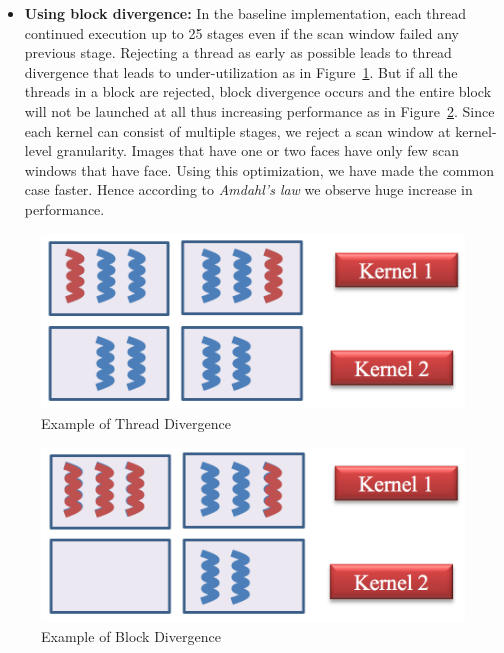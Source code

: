 \begin{itemize}
\vspace{0.1in}
\item \textbf{Using block divergence:}
In the baseline implementation, each thread continued execution up to 25 stages 
even if the scan window failed any previous stage. Rejecting a thread as early as possible leads to thread 
divergence that leads to under-utilization as in Figure~\ref{fig:tdiv}. But if all the threads in a block 
are rejected, block divergence occurs and the entire block will not be launched at all thus increasing 
performance as in Figure~\ref{fig:bdiv}. Since each kernel can consist of multiple stages, we reject a 
scan window at kernel-level granularity. Images that have one or two faces have only few scan windows that 
have face. Using this optimization, we have made the common case faster. Hence according to 
\emph{Amdahl’s law} we observe huge increase in performance. 

\end{itemize}
\begin{figure}[h]
  \centering 
  \includegraphics[width=\linewidth]{figs/thread_div.png}
  \caption{Example of Thread Divergence \textnormal{\small }  }
  \label{fig:tdiv}
\end{figure}


\begin{figure}[h]
  \centering 
  \includegraphics[width=\linewidth]{figs/block_div.png}
  \caption{Example of Block Divergence \textnormal{\small }  }
  \label{fig:bdiv}
\end{figure}


